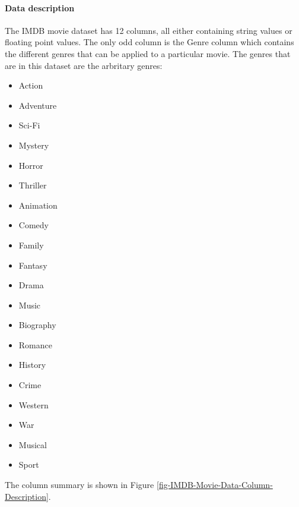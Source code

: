     \paragraph{Data description}
        The IMDB movie dataset has 12 columns, all either containing string values or floating point values.
        The only odd column is the Genre column which contains the different genres that can be applied to a particular movie.
        The genres that are in this dataset are the arbritary genres: 
        \begin{multicols}{5}
            \begin{itemize}
                \item Action 
                \item Adventure 
                \item Sci-Fi 
                \item Mystery 
                \item Horror 
                \item Thriller 
                \item Animation 
                \item Comedy 
                \item Family 
                \item Fantasy 
                \item Drama 
                \item Music 
                \item Biography 
                \item Romance 
                \item History 
                \item Crime 
                \item Western 
                \item War 
                \item Musical 
                \item Sport
            \end{itemize}
        \end{multicols}
        The column summary is shown in Figure \ref*{fig-IMDB-Movie-Data-Column-Description}.
